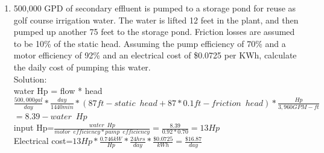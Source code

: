 \documentclass{article}
\begin{document}
\begin{enumerate}
\item 500,000 GPD of secondary effluent is pumped to  a  storage  pond  for  reuse  as golf course irrigation water.  The water is lifted 12 feet in the plant, and then pumped up another 75 feet to the storage pond. Friction losses are assumed to be 10\% of the static head.  Assuming the pump efficiency of 70\% and a motor efficiency of 92\% and an electrical cost of \$0.0725 per KWh, calculate the daily cost of pumping this water.\\
\vspace{0.4cm}
Solution:\\

water Hp = flow * head\\
\vspace{0.4cm}
$\frac{500,000gal}{day}*\frac{day}{1440min}*(87ft-static \enspace head+87*0.1ft-friction \enspace head)*\frac{Hp}{3,960 GPM-ft}$\\
\vspace{0.4cm}
$=8.39 - water \enspace Hp$\\
\vspace{0.4cm}
input Hp=$\frac{water \enspace Hp}{motor \enspace efficiency*pump \enspace efficiency}=\frac{8.39}{0.92*0.70}=\boxed{13Hp}$\\
\vspace{0.4cm}
Electrical cost=$13Hp*\frac{0.746kW}{Hp}*\frac{24hrs}{day}*\frac{\$0.0725}{kWh}=\boxed{\frac{\$16.87}{day}}$

\vspace{0.4cm}


\end{enumerate}
\newpage
\end{document}

